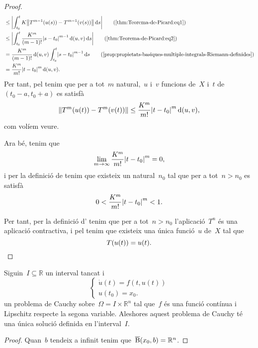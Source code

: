 \documentclass[../../main.tex]{subfiles}
\begin{document}
\begin{proof}
\begin{align*}
            &\leq\abs{\int_{t_{0}}^{t}K\norm{T^{m-1}(u(s))-T^{m-1}(v(s))}\diff s}\tag{\ref{thm:Teorema-de-Picard:eq1}}\\
            &\leq\abs{\int_{t_{0}}^{t}\frac{K^{m}}{(m-1)!}\abs{s-t_{0}}^{m-1}\distancia(u,v)\diff s}\tag{\ref{thm:Teorema-de-Picard:eq2}}\\
            &=\frac{K^{m}}{(m-1)!}\distancia(u,v)\int_{t_{0}}^{t}\abs{s-t_{0}}^{m-1}\diff s\tag{\ref{prop:propietats-basiques-multiple-integrals-Riemann-definides}}\\
            &=\frac{K^{m}}{m!}\abs{t-t_{0}}^{m}\distancia(u,v).%
        \end{align*}
        Per tant, pel  tenim que per a tot~\(m\) natural,~\(u\) i~\(v\) funcions de~\(X\) i~\(t\) de~\((t_{0}-a,t_{0}+a)\) es satisfà
        \[
            \norm{T^{m}(u(t))-T^{m}(v(t))}\leq\frac{K^{m}}{m!}\abs{t-t_{0}}^{m}\distancia(u,v),
        \]
        com volíem veure.

        Ara bé, tenim que
        \[
            \lim_{m\to\infty}\frac{K^{m}}{m!}\abs{t-t_{0}}^{m}=0,
        \]%
        i per la definició de  tenim que existeix un natural~\(n_{0}\) tal que per a tot~\(n>n_{0}\) es satisfà
        \[
            0<{\frac{K^{m}}{m!}\abs{t-t_{0}}^{m}}<1.
        \]

        Per tant, per la definició d' tenim que per a tot~\(n>n_{0}\) l'aplicació~\(T^{n}\) és una aplicació contractiva, i pel \corollari{}  tenim que existeix una única funció~\(u\) de~\(X\) tal que
        \[
            T(u(t))=u(t).\qedhere
        \]
    \end{proof}
    \begin{corollary}
        \label{cor:Teorema-de-Picard}
        Siguin~\(I\subseteq\mathbb{R}\) un interval tancat i
        \[\begin{cases}
            \displaystyle \dot{u}(t)=f(t,u(t)) \\
            \displaystyle u(t_{0})=x_{0}.
        \end{cases}\]
        un problema de Cauchy sobre~\(\Omega=I\times\mathbb{R}^{n}\) tal que~\(f\) és una funció contínua i Lipschitz respecte la segona variable.
        Aleshores aquest problema de Cauchy té una única solució definida en l'interval~\(I\).
    \end{corollary}
    \begin{proof}
        Quan~\(b\) tendeix a infinit tenim que~\(\overline{\operatorname{B}}(x_{0},b)=\mathbb{R}^{n}\).
    \end{proof}
\end{document}
